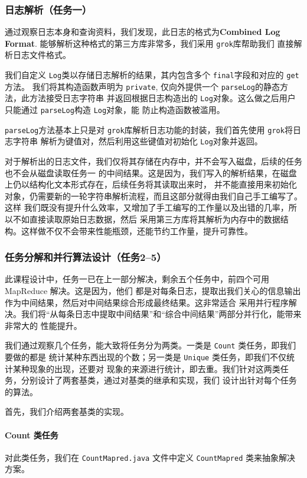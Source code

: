 \documentclass{article}
\begin{document}
  \subsubsection{日志解析（任务一）}
  通过观察日志本身和查询资料，我们发现，此日志的格式为\textbf{Combined Log Format}\cite{clf}. 能够解析这种格式的第三方库非常多，我们采用 \verb|grok|\cite{grok}库帮助我们
  直接解析日志文件格式。

  我们自定义 \verb|Log|类以存储日志解析的结果，其内包含多个 \verb|final|字段和对应的 \verb|get|方法。
  我们将其构造函数声明为 \verb|private|, 仅向外提供一个 \verb|parseLog|的静态方法，此方法接受日志字符串
  并返回根据日志构造出的 \verb|Log|对象。这么做之后用户只能通过 \verb|parseLog|构造 \verb|Log|对象，能
  防止构造函数被滥用。

  \verb|parseLog|方法基本上只是对 \verb|grok|库解析日志功能的封装，我们首先使用 \verb|grok|将日志字符串
  解析为键值对，然后利用这些键值对初始化 \verb|Log|对象并返回。

  对于解析出的日志文件，我们仅将其存储在内存中，并不会写入磁盘，后续的任务也不会从磁盘读取任务一
  的中间结果。这是因为，我们写入的解析结果，在磁盘上仍以结构化文本形式存在，后续任务将其读取出来时，
  并不能直接用来初始化对象，仍需要新的一轮字符串解析流程，而且这部分就得由我们自己手工编写了。这样
  我们既没有提升什么效率，又增加了手工编写的工作量以及出错的几率，所以不如直接读取原始日志数据，然后
  采用第三方库将其解析为内存中的数据结构。这样做不仅不会带来性能瓶颈，还能节约工作量，提升可靠性。

  \subsubsection{任务分解和并行算法设计（任务2--5）}

  此课程设计中，任务一已在上一部分解决，剩余五个任务中，前四个可用 MapReduce 解决。这是因为，他们
  都是对每条日志，提取出我们关心的信息输出作为中间结果，然后对中间结果综合形成最终结果。这非常适合
  采用并行程序解决。我们将``从每条日志中提取中间结果''和``综合中间结果''两部分并行化，能带来非常大的
  性能提升。

  我们通过观察几个任务，能大致将任务分为两类。一类是 \verb|Count| 类任务，即我们要做的都是
  统计某种东西出现的个数；另一类是 \verb|Unique| 类任务，即我们不仅统计某种现象的出现，还要对
  现象的来源进行统计，即去重。我们针对这两类任务，分别设计了两套基类，通过对基类的继承和实现，我们
  设计出针对每个任务的算法。

  首先，我们介绍两套基类的实现。

  \paragraph{Count 类任务} 对此类任务，我们在 \verb|CountMapred.java| 文件中定义 \verb|CountMapred| 类来抽象解决方案。
\end{document}
